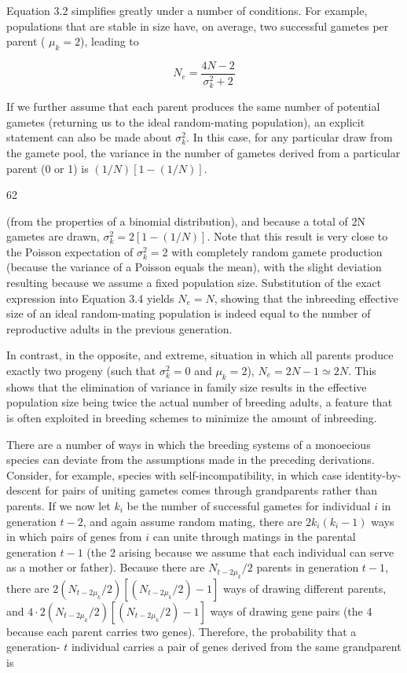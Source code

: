\documentclass{article}
\begin{document}
Equation 3.2 simplifies greatly under a number of conditions. For example, populations that are stable in size have, on average, two successful gametes per parent ( $ \mu_k = 2 $), leading to

\begin{equation}
N_{e}=\frac{4N-2}{\sigma_{k}^{2}+2}
\tag{3.4}
\label{eq:3_4}
\end{equation}

If we further assume that each parent produces the same number of potential gametes (returning us to the ideal random-mating population), an explicit statement can also be made about  $ \sigma_k^2 $. In this case, for any particular draw from the gamete pool, the variance in the number of gametes derived from a particular parent (0 or 1) is  $ (1/N)[1 - (1/N)] $.

62

(from the properties of a binomial distribution), and because a total of 2N gametes are drawn,  $ \sigma_k^2 = 2[1 - (1/N)] $. Note that this result is very close to the Poisson expectation of  $ \sigma_k^2 = 2 $ with completely random gamete production (because the variance of a Poisson equals the mean), with the slight deviation resulting because we assume a fixed population size. Substitution of the exact expression into Equation 3.4 yields  $ N_e = N $, showing that the inbreeding effective size of an ideal random-mating population is indeed equal to the number of reproductive adults in the previous generation.

In contrast, in the opposite, and extreme, situation in which all parents produce exactly two progeny (such that  $ \sigma_k^2 = 0 $ and  $ \mu_k = 2 $),  $ N_e = 2N - 1 \simeq 2N $. This shows that the elimination of variance in family size results in the effective population size being twice the actual number of breeding adults, a feature that is often exploited in breeding schemes to minimize the amount of inbreeding.

There are a number of ways in which the breeding systems of a monoecious species can deviate from the assumptions made in the preceding derivations. Consider, for example, species with self-incompatibility, in which case identity-by-descent for pairs of uniting gametes comes through grandparents rather than parents. If we now let  $ k_i $ be the number of successful gametes for individual  $ i $ in generation  $ t - 2 $, and again assume random mating, there are  $ 2k_i(k_i - 1) $ ways in which pairs of genes from  $ i $ can unite through matings in the parental generation  $ t - 1 $ (the 2 arising because we assume that each individual can serve as a mother or father). Because there are  $ N_{t-2\mu_k}/2 $ parents in generation  $ t - 1 $, there are  $ 2(N_{t-2\mu_k}/2)[(N_{t-2\mu_k}/2) - 1] $ ways of drawing different parents, and  $ 4 \cdot 2(N_{t-2\mu_k}/2)[(N_{t-2\mu_k}/2) - 1] $ ways of drawing gene pairs (the 4 because each parent carries two genes). Therefore, the probability that a generation- $ t $ individual carries a pair of genes derived from the same grandparent is
\end{document}
